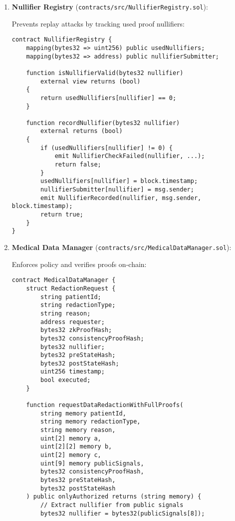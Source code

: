 \begin{enumerate}
    \item \textbf{Nullifier Registry} (\texttt{contracts/src/NullifierRegistry.sol}):
    
    Prevents replay attacks by tracking used proof nullifiers:
    
    \begin{verbatim}
contract NullifierRegistry {
    mapping(bytes32 => uint256) public usedNullifiers;
    mapping(bytes32 => address) public nullifierSubmitter;
    
    function isNullifierValid(bytes32 nullifier) 
        external view returns (bool) 
    {
        return usedNullifiers[nullifier] == 0;
    }
    
    function recordNullifier(bytes32 nullifier) 
        external returns (bool) 
    {
        if (usedNullifiers[nullifier] != 0) {
            emit NullifierCheckFailed(nullifier, ...);
            return false;
        }
        usedNullifiers[nullifier] = block.timestamp;
        nullifierSubmitter[nullifier] = msg.sender;
        emit NullifierRecorded(nullifier, msg.sender, block.timestamp);
        return true;
    }
}
\end{verbatim}
    
    \item \textbf{Medical Data Manager} (\texttt{contracts/src/MedicalDataManager.sol}):
    
    Enforces policy and verifies proofs on-chain:
    
    \begin{verbatim}
contract MedicalDataManager {
    struct RedactionRequest {
        string patientId;
        string redactionType;
        string reason;
        address requester;
        bytes32 zkProofHash;
        bytes32 consistencyProofHash;
        bytes32 nullifier;
        bytes32 preStateHash;
        bytes32 postStateHash;
        uint256 timestamp;
        bool executed;
    }
    
    function requestDataRedactionWithFullProofs(
        string memory patientId,
        string memory redactionType,
        string memory reason,
        uint[2] memory a,
        uint[2][2] memory b,
        uint[2] memory c,
        uint[9] memory publicSignals,
        bytes32 consistencyProofHash,
        bytes32 preStateHash,
        bytes32 postStateHash
    ) public onlyAuthorized returns (string memory) {
        // Extract nullifier from public signals
        bytes32 nullifier = bytes32(publicSignals[8]);
        

\end{verbatim}
\end{enumerate}
